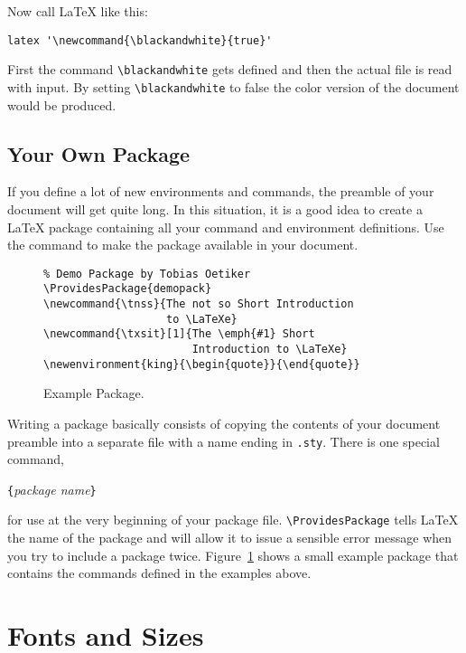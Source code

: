 Now call \LaTeX{} like this:
\begin{verbatim}
latex '\newcommand{\blackandwhite}{true}'
\end{verbatim}

First the command \verb|\blackandwhite| gets defined and then the actual file is read with input.
By setting \verb|\blackandwhite| to false the color version of the document would be produced.

\subsection{Your Own Package}

If you define a lot of new environments and commands, the preamble of
your document will get quite long. In this situation, it is a good
idea to create a \LaTeX{} package containing all your command and
environment definitions. Use the 
command to make the package available in your document.

\begin{figure}[!htbp]
\begin{lined}{\textwidth}
\begin{verbatim}
% Demo Package by Tobias Oetiker
\ProvidesPackage{demopack}
\newcommand{\tnss}{The not so Short Introduction
                   to \LaTeXe}
\newcommand{\txsit}[1]{The \emph{#1} Short
                       Introduction to \LaTeXe}
\newenvironment{king}{\begin{quote}}{\end{quote}}
\end{verbatim}
\end{lined}
\caption{Example Package.} \label{package}
\end{figure}

Writing a package basically consists of copying the contents of
your document preamble into a separate file with a name ending in
\texttt{.sty}. There is one special command,
\begin{lscommand}
\verb|{|\emph{package name}\verb|}|
\end{lscommand}
\noindent for use at the very beginning of your package
file. \verb|\ProvidesPackage| tells \LaTeX{} the name of the package
and will allow it to issue a sensible error message when you try to
include a package twice. Figure~\ref{package} shows a small example
package that contains the commands defined in the examples above.

\section{Fonts and Sizes}
\label{sec:fontsize}

